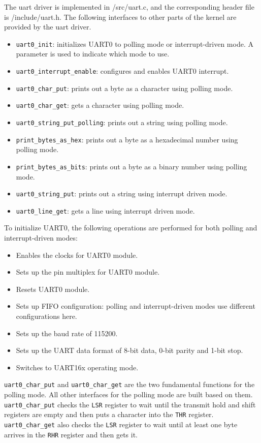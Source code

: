 \documentclass[12pt]{article}
\newcommand{\code}[1]{\colorbox{codegray}{\texttt{\footnotesize{#1}}}}
\begin{document}
The uart driver is implemented in /src/uart.c, and the corresponding header file
is /include/uart.h. The following interfaces to other parts of the
kernel are provided by the uart driver.

\begin{itemize}
	\item \code{uart0\_init}: initializes UART0 to polling mode or
	      interrupt-driven mode. A parameter is used to indicate which mode to
	      use.
	\item \code{uart0\_interrupt\_enable}: configures and enables UART0
	      interrupt.
	\item \code{uart0\_char\_put}: prints out a byte as a character using
	      polling mode.
	\item \code{uart0\_char\_get}: gets a character using polling mode.
	\item \code{uart0\_string\_put\_polling}: prints out a string using
	      polling mode.
	\item \code{print\_bytes\_as\_hex}: prints out a byte as a hexadecimal
	      number using polling mode.
	\item \code{print\_bytes\_as\_bits}: prints out a byte as a binary
	      number using polling mode.
	\item \code{uart0\_string\_put}: prints out a string using interrupt
	      driven mode.
	\item \code{uart0\_line\_get}: gets a line using interrupt driven mode.
\end{itemize}

To initialize UART0, the following operations are performed for both polling
and interrupt-driven modes:
\begin{itemize}
	\item Enables the clocks for UART0 module.
	\item Sets up the pin multiplex for UART0 module.
	\item Resets UART0 module.
	\item Sets up FIFO configuration: polling and interrupt-driven modes use different configurations here.
	\item Sets up the baud rate of 115200.
	\item Sets up the UART data format of 8-bit data, 0-bit parity and 1-bit stop.
	\item Switches to UART16x operating mode.
\end{itemize}

\code{uart0\_char\_put} and \code{uart0\_char\_get} are the two
fundamental functions for the polling mode. All other interfaces for the
polling mode are built based on them. \code{uart0\_char\_put} checks the
\code{LSR} register to wait until the transmit hold and shift registers
are empty and then puts a character into the \code{THR} register.
\code{uart0\_char\_get} also checks the \code{LSR} register to wait until
at least one byte arrives in the \code{RHR} register and then gets it.
\end{document}
